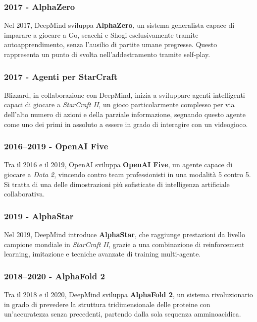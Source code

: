 \subsubsection{2017 - AlphaZero}

Nel 2017, DeepMind sviluppa \textbf{AlphaZero}, un sistema generalista capace di imparare a giocare a Go, scacchi e Shogi esclusivamente tramite autoapprendimento, senza l’ausilio di partite umane pregresse. Questo rappresenta un punto di svolta nell’addestramento tramite self-play.

\subsubsection{2017 - Agenti per StarCraft}

Blizzard, in collaborazione con DeepMind, inizia a sviluppare agenti intelligenti capaci di giocare a \emph{StarCraft II}, un gioco particolarmente complesso per via dell’alto numero di azioni e della parziale informazione, segnando questo agente come uno dei primi in assoluto a essere in grado di interagire con un videogioco.

\subsubsection{2016–2019 - OpenAI Five}

Tra il 2016 e il 2019, OpenAI sviluppa \textbf{OpenAI Five}, un agente capace di giocare a \emph{Dota 2}, vincendo contro team professionisti in una modalità 5 contro 5. Si tratta di una delle dimostrazioni più sofisticate di intelligenza artificiale collaborativa.

\subsubsection{2019 - AlphaStar}

Nel 2019, DeepMind introduce \textbf{AlphaStar}, che raggiunge prestazioni da livello campione mondiale in \emph{StarCraft II}, grazie a una combinazione di reinforcement learning, imitazione e tecniche avanzate di training multi-agente.

\subsubsection{2018–2020 - AlphaFold 2}

Tra il 2018 e il 2020, DeepMind sviluppa \textbf{AlphaFold 2}, un sistema rivoluzionario in grado di prevedere la struttura tridimensionale delle proteine con un'accuratezza senza precedenti, partendo dalla sola sequenza amminoacidica.


